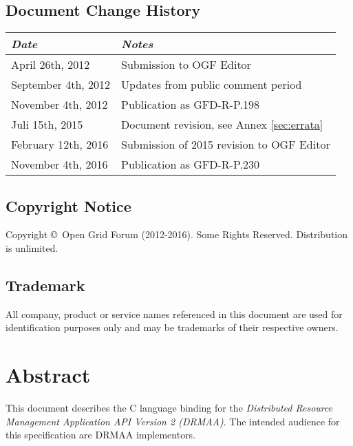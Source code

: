 \documentclass{article}
\newcommand{\copyrightyears}{2012-2016}
\begin{document}
\subsection*{Document Change History}
\vspace*{-1em}
\begin{table}[ht]
\centering
\begin{tabularx}{\textwidth}{XX}
\toprule
\emph{Date} & \emph{Notes} \\
\midrule
April     26th, 2012 & Submission to OGF Editor \\
September  4th, 2012 & Updates from public comment period \\
November   4th, 2012 & Publication as  GFD-R-P.198 \\
Juli      15th, 2015 & Document revision, see Annex \ref{sec:errata} \\
February  12th, 2016 & Submission of 2015 revision to OGF Editor \\
November   4th, 2016 & Publication as GFD-R-P.230 \\
\bottomrule
\end{tabularx}
\end{table}
\vspace*{1em}


\subsection*{Copyright Notice}

Copyright \copyright \ Open Grid Forum (\copyrightyears).  Some Rights Reserved.
Distribution is unlimited.\\

\subsection*{Trademark}

All company, product or service names referenced in this document are used for identification purposes only and may be trademarks of their respective owners. \\

\section*{Abstract}

This document describes the C language binding for the \emph{Distributed Resource Management Application API Version 2 (DRMAA)}. The intended audience for this specification are DRMAA implementors. \\
\end{document}
